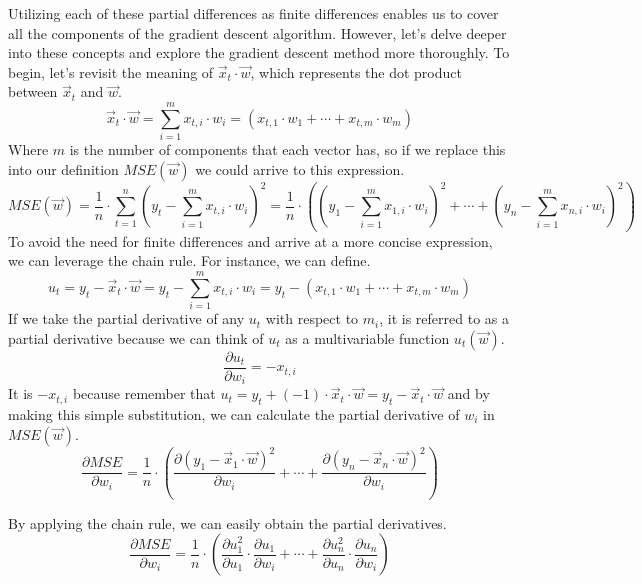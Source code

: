 Utilizing each of these partial differences as finite differences enables us to cover all the components of
the gradient descent algorithm. However, let's delve deeper into these concepts and explore the gradient
descent method more thoroughly. To begin, let's revisit the meaning of $\vec{x}_t \cdot \vec{w}$, which
represents the dot product between $\vec{x}_t$ and $\vec{w}$.
\[
\vec{x}_t \cdot \vec{w} = \sum_{i = 1}^{m} x_{t, i} \cdot w_i = (x_{t, 1} \cdot w_1 + \cdots + x_{t, m} \cdot w_m)
\]
Where $m$ is the number of components that each vector has, so if we replace this into our definition
$MSE(\vec{w})$ we could arrive to this expression.
\[
MSE(\vec{w}) = \frac{1}{n} \cdot \sum_{t = 1}^{n}(y_t - \sum_{i = 1}^{m}x_{t, i} \cdot w_i)^2
= \frac{1}{n} \cdot ((y_1 - \sum_{i = 1}^{m}x_{1, i} \cdot w_i)^2 + \cdots + (y_n - \sum_{i = 1}^{m}x_{n, i} \cdot w_i)^2)
\]
To avoid the need for finite differences and arrive at a more concise expression, we can leverage the
chain rule. For instance, we can define.
\[
u_t = y_t - \vec{x}_t \cdot \vec{w} = y_t - \sum_{i = 1}^{m}x_{t, i} \cdot w_i
= y_t - (x_{t, 1} \cdot w_1 + \cdots + x_{t, m} \cdot w_m)
\]
If we take the partial derivative of any $u_t$ with respect to $m_i$, it is referred to as a partial derivative
because we can think of $u_t$ as a multivariable function $u_t(\vec{w})$.
\[
\frac{\partial u_t}{\partial w_i} = - x_{t, i}
\]
It is $-x_{t, i}$ because remember that
$u_t = y_t + (-1) \cdot \vec{x}_t \cdot \vec{w} = y_t - \vec{x}_t \cdot \vec{w}$ and 
by making this simple substitution, we can calculate the partial derivative of $w_i$ in $MSE(\vec{w})$.
\[
\frac{\partial MSE}{\partial w_i} = \frac{1}{n} \cdot (
\frac{\partial (y_1 - \vec{x}_1 \cdot \vec{w})^2}{\partial w_i} + \cdots +
\frac{\partial (y_n - \vec{x}_n \cdot \vec{w})^2}{\partial w_i})
\]

By applying the chain rule, we can easily obtain the partial derivatives.
\[
\frac{\partial MSE}{\partial w_i} = \frac{1}{n} \cdot (
\frac{\partial u_1^2}{\partial u_1} \cdot \frac{\partial u_1}{\partial w_i} + \cdots +
\frac{\partial u_n^2}{\partial u_n} \cdot \frac{\partial u_n}{\partial w_i})
\]

